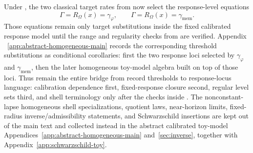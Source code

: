 Under , the two classical target rates from
 now select the response-level equations
\[
\Gamma=R_\Omega(x)=\gamma_\varphi,
\qquad
\Gamma=R_\Omega(x)=\gamma_{\mathrm{mem}}.
\]
Those equations remain only target substitutions inside the fixed calibrated
response model until the range and regularity checks from
 are verified. Appendix
~\ref{app:abstract-homogeneous-main} records the corresponding threshold
substitutions as conditional corollaries: first the two response loci
selected by $\gamma_\varphi$ and $\gamma_{\mathrm{mem}}$, then the later
homogeneous toy-model algebra built on top of those loci. Thus
remain the entire bridge from record thresholds to response-locus language:
calibration dependence first, fixed-response closure second, regular level
sets third, and shell terminology only after the checks inside
. The nonconstant-lapse homogeneous shell
specializations, quotient laws, near-horizon limits, fixed-radius
inverse/admissibility statements, and Schwarzschild insertions are kept out of
the main text and collected instead in the abstract calibrated toy-model
Appendices~\ref{app:abstract-homogeneous-main} and~\ref{sec:inverse},
together with Appendix~\ref{app:schwarzschild-toy}.
